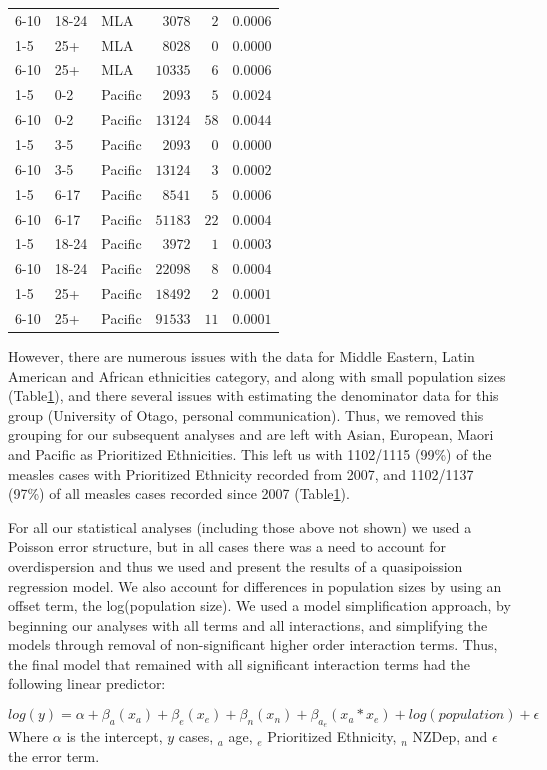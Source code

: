 \documentclass{article}
\begin{document}
\begin{table}
\begin{center}
\begin{tabular}{lllrrr}
6-10&18-24&MLA&$   3078$&$  2$&$0.0006$\tabularnewline
1-5&25+&MLA&$   8028$&$  0$&$0.0000$\tabularnewline
6-10&25+&MLA&$  10335$&$  6$&$0.0006$\tabularnewline
1-5&0-2&Pacific&$   2093$&$  5$&$0.0024$\tabularnewline
6-10&0-2&Pacific&$  13124$&$ 58$&$0.0044$\tabularnewline
1-5&3-5&Pacific&$   2093$&$  0$&$0.0000$\tabularnewline
6-10&3-5&Pacific&$  13124$&$  3$&$0.0002$\tabularnewline
1-5&6-17&Pacific&$   8541$&$  5$&$0.0006$\tabularnewline
6-10&6-17&Pacific&$  51183$&$ 22$&$0.0004$\tabularnewline
1-5&18-24&Pacific&$   3972$&$  1$&$0.0003$\tabularnewline
6-10&18-24&Pacific&$  22098$&$  8$&$0.0004$\tabularnewline
1-5&25+&Pacific&$  18492$&$  2$&$0.0001$\tabularnewline
6-10&25+&Pacific&$  91533$&$ 11$&$0.0001$\tabularnewline
\hline
\end{tabular}\end{center}\label{table:percap}
\end{table}

However, there are numerous issues with the data for Middle Eastern, Latin American and African ethnicities category, and along with small population sizes (Table\ref{table:percap}), and there several issues with estimating the denominator data for this group (University of Otago, personal communication). Thus, we removed this grouping for our subsequent analyses and are left with Asian, European, Maori and Pacific as Prioritized Ethnicities. This left us with 1102/1115 (99\%) of the measles cases with Prioritized Ethnicity recorded from 2007, and 1102/1137 (97\%) of all measles cases recorded since 2007 (Table\ref{table:percap}).

For all our statistical analyses (including those above not shown) we used a Poisson error structure, but in all cases there was a need to account for overdispersion and thus we used and present the results of a quasipoission regression model. We also account for differences in population sizes by using an offset term, the log(population size). We used a model simplification approach, by beginning our analyses with all terms and all interactions, and simplifying the models through removal of non-significant higher order interaction terms. Thus, the final model that remained with all significant interaction terms had the following linear predictor:

\begin{equation} \label{eq:reg}
 log(y) = \alpha + \beta _a (x_a)+ \beta _e(x_e)+ \beta _n (x_n) + \beta _a_e(x_a * x_e)+ log(population)  + \epsilon
  \end{equation}
Where $\alpha$ is the intercept, $y$ cases, $_a$ age, $_e$ Prioritized Ethnicity, $_n$ NZDep, and $\epsilon$ the error term.
\end{document}

